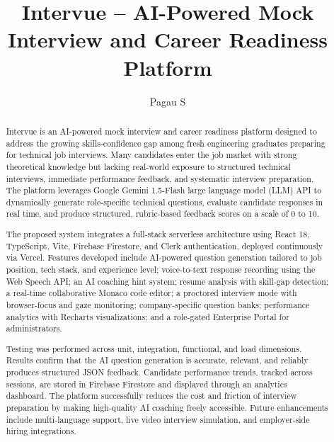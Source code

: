 \documentclass{fisatprojectfinal}
\title{Intervue -- AI-Powered Mock Interview and Career Readiness Platform}
\author{Pagau S}
\begin{document}
\maketitle
\makecert

\newpage
{}
\setcounter{page}{1}
\thispagestyle{empty}
\renewcommand\abstractname{ABSTRACT}

\begin{abstract}
\vspace{2cm}
\begin{onehalfspace}
Intervue is an AI-powered mock interview and career readiness platform designed to address
the growing skills-confidence gap among fresh engineering graduates preparing for technical
job interviews. Many candidates enter the job market with strong theoretical knowledge but
lacking real-world exposure to structured technical interviews, immediate performance
feedback, and systematic interview preparation. The platform leverages Google Gemini
1.5-Flash large language model (LLM) API to dynamically generate role-specific technical
questions, evaluate candidate responses in real time, and produce structured, rubric-based
feedback scores on a scale of 0 to 10.

The proposed system integrates a full-stack serverless architecture using React 18,
TypeScript, Vite, Firebase Firestore, and Clerk authentication, deployed continuously via
Vercel. Features developed include AI-powered question generation tailored to job position,
tech stack, and experience level; voice-to-text response recording using the Web Speech
API; an AI coaching hint system; resume analysis with skill-gap detection; a real-time
collaborative Monaco code editor; a proctored interview mode with browser-focus and gaze
monitoring; company-specific question banks; performance analytics with Recharts
visualizations; and a role-gated Enterprise Portal for administrators.

Testing was performed across unit, integration, functional, and load dimensions. Results
confirm that the AI question generation is accurate, relevant, and reliably produces
structured JSON feedback. Candidate performance trends, tracked across sessions, are stored
in Firebase Firestore and displayed through an analytics dashboard. The platform
successfully reduces the cost and friction of interview preparation by making high-quality
AI coaching freely accessible. Future enhancements include multi-language support, live
video interview simulation, and employer-side hiring integrations.
\end{onehalfspace}
\end{abstract}   %
\end{document}
